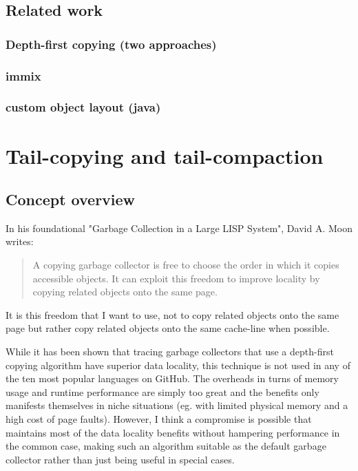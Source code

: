 \documentclass[a4paper,oneside]{memoir}
\begin{document}
\section{Related work}
\subsection{Depth-first copying (two approaches)}
\subsection{immix}
\subsection{custom object layout (java)}

\chapter{Tail-copying and tail-compaction}

\section{Concept overview}
\label{concept_overview}

In his foundational "Garbage Collection in a Large LISP System", David A. Moon writes:
\blockquote{A copying garbage collector is free to choose the order in which
it copies accessible objects. It can exploit this freedom to improve locality by
copying related objects onto the same page.}
\cite{Moon:1984}
It is this freedom that I want to use, not to copy related objects onto the same
page but rather copy related objects onto the same cache-line when possible.

While it has been shown that tracing garbage collectors that use a depth-first
copying algorithm have superior data locality, this technique is not used in any
of the ten most popular languages on GitHub. The overheads in turns of memory
usage and runtime performance are simply too great and the benefits only
manifests themselves in niche situations (eg. with limited physical memory and
a high cost of page faults). However, I think a compromise is possible that
maintains most of the data locality benefits without hampering performance in
the common case, making such an algorithm suitable as the default garbage
collector rather than just being useful in special cases.
\end{document}
